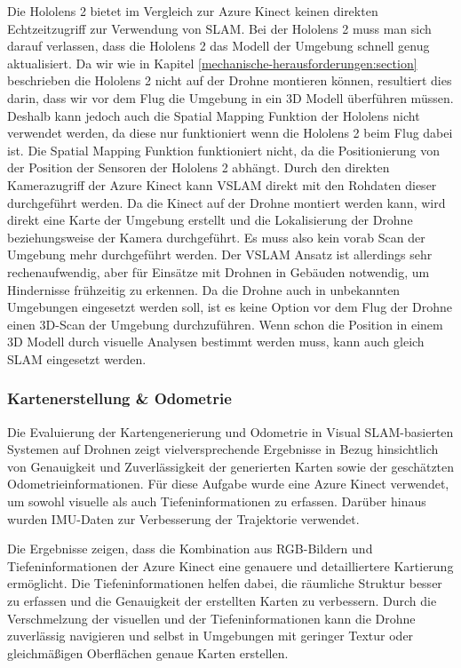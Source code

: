 Die Hololens 2 bietet im Vergleich zur Azure Kinect keinen direkten Echtzeitzugriff zur Verwendung von \ac{SLAM}. Bei der Hololens 2 muss man sich darauf verlassen, dass die Hololens 2 das Modell der Umgebung schnell genug aktualisiert. Da wir wie in Kapitel \ref{mechanische-herausforderungen:section} beschrieben die Hololens 2 nicht auf der Drohne montieren können, resultiert dies darin, dass wir vor dem Flug die Umgebung in ein 3D Modell überführen müssen. Deshalb kann jedoch auch die Spatial Mapping Funktion der Hololens nicht verwendet werden, da diese nur funktioniert wenn die Hololens 2 beim Flug dabei ist.
Die Spatial Mapping Funktion funktioniert nicht, da die Positionierung von der Position der Sensoren der Hololens 2 abhängt.
Durch den direkten Kamerazugriff der Azure Kinect kann \ac{VSLAM} direkt mit den Rohdaten dieser durchgeführt werden. Da die Kinect auf der Drohne montiert werden kann, wird direkt eine Karte der Umgebung erstellt und die Lokalisierung der Drohne beziehungsweise der Kamera durchgeführt. Es muss also kein vorab Scan der Umgebung mehr durchgeführt werden. Der \ac{VSLAM} Ansatz ist allerdings sehr rechenaufwendig, aber für Einsätze mit Drohnen in Gebäuden notwendig, um Hindernisse frühzeitig zu erkennen. Da die Drohne auch in unbekannten Umgebungen eingesetzt werden soll, ist es keine Option vor dem Flug der Drohne einen 3D-Scan der Umgebung durchzuführen. Wenn schon die Position in einem 3D Modell durch visuelle Analysen bestimmt werden muss, kann auch gleich \ac{SLAM} eingesetzt werden.

\subsubsection{Kartenerstellung \& Odometrie}

Die Evaluierung der Kartengenerierung und Odometrie in Visual SLAM-basierten Systemen auf Drohnen zeigt vielversprechende Ergebnisse in Bezug hinsichtlich von Genauigkeit und Zuverlässigkeit der generierten Karten sowie der geschätzten Odometrieinformationen. Für diese Aufgabe wurde eine Azure Kinect verwendet, um sowohl visuelle als auch Tiefeninformationen zu erfassen. Darüber hinaus wurden \ac{IMU}-Daten zur Verbesserung der Trajektorie verwendet.

Die Ergebnisse zeigen, dass die Kombination aus RGB-Bildern und Tiefeninformationen der Azure Kinect eine genauere und detailliertere Kartierung ermöglicht. Die Tiefeninformationen helfen dabei, die räumliche Struktur besser zu erfassen und die Genauigkeit der erstellten Karten zu verbessern. Durch die Verschmelzung der visuellen und der Tiefeninformationen kann die Drohne zuverlässig navigieren und selbst in Umgebungen mit geringer Textur oder gleichmäßigen Oberflächen genaue Karten erstellen.

